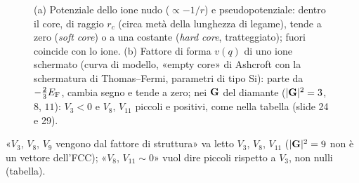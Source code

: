 \documentclass[11pt,a4paper]{article}
\begin{document}
\begin{figure}[tbp]
\centering
{}
\caption{(a) Potenziale dello ione nudo ($\propto-1/r$) e pseudopotenziale: dentro il core, di raggio $r_c$ (circa metà della lunghezza di
legame), tende a zero (\emph{soft core}) o a una costante (\emph{hard core}, tratteggiato); fuori coincide con lo ione. (b) Fattore di forma
$v(q)$ di uno ione schermato (curva di modello, «empty core» di Ashcroft con la schermatura di Thomas--Fermi, parametri di tipo Si): parte da
$-\frac23E_{\mathrm F}$, cambia segno e tende a zero; nei $\mathbf G$ del diamante ($|\mathbf G|^2=3$, $8$, $11$): $V_3<0$ e $V_8$, $V_{11}$ piccoli e positivi, come nella
tabella (slide 24 e 29).}\label{fig:pseudo}
\end{figure}

\begin{osservazione}[slide 24]
«$V_3$, $V_8$, $V_9$ vengono dal fattore di struttura» va letto $V_3$, $V_8$, $V_{11}$ ($|\mathbf G|^2=9$ non è un vettore dell'FCC); «$V_8$, $V_{11}\sim0$»
vuol dire piccoli rispetto a $V_3$, non nulli (tabella).
\end{osservazione}
\end{document}

